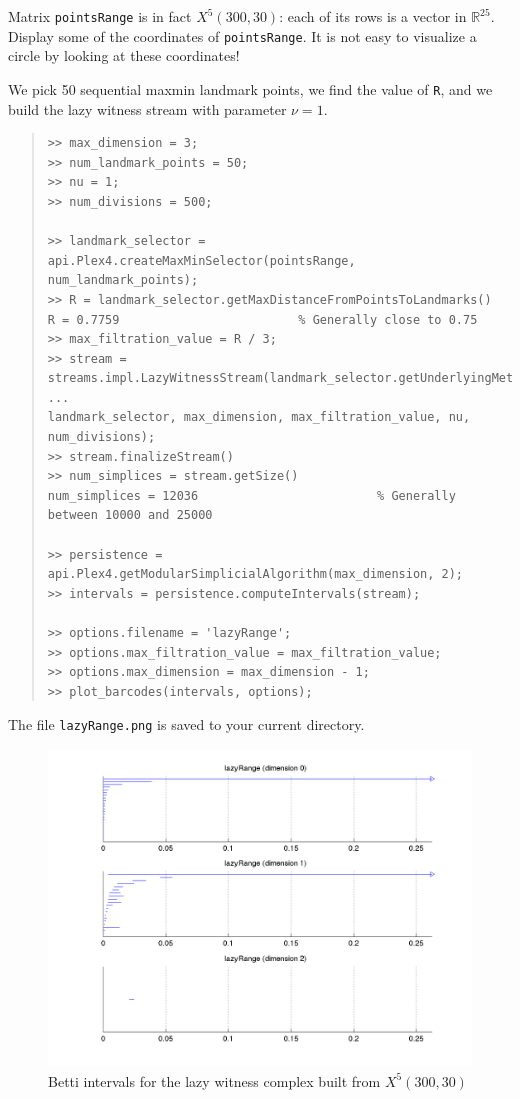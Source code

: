 \documentclass[amscd, amssymb, verbatim]{amsart}[12pt]
\theoremstyle{remark}
\theoremstyle{remark}
\theoremstyle{remark}
\begin{document}
Matrix \texttt{pointsRange} is in fact $X^5(300,30)$: each of its rows is a vector in $\mathbb{R}^{25}$. Display some of the coordinates of \texttt{pointsRange}. It is not easy to visualize a circle by looking at these coordinates! 

We pick 50 sequential maxmin landmark points, we find the value of \texttt{R}, and we build the lazy witness stream with parameter $\nu = 1$. 

\begin{quote} \begin{verbatim}
>> max_dimension = 3;
>> num_landmark_points = 50;
>> nu = 1;
>> num_divisions = 500;

>> landmark_selector = api.Plex4.createMaxMinSelector(pointsRange, num_landmark_points);
>> R = landmark_selector.getMaxDistanceFromPointsToLandmarks() 
R = 0.7759                         % Generally close to 0.75
>> max_filtration_value = R / 3;
>> stream = streams.impl.LazyWitnessStream(landmark_selector.getUnderlyingMetricSpace(), ...
landmark_selector, max_dimension, max_filtration_value, nu, num_divisions);
>> stream.finalizeStream()
>> num_simplices = stream.getSize()
num_simplices = 12036                         % Generally between 10000 and 25000

>> persistence = api.Plex4.getModularSimplicialAlgorithm(max_dimension, 2);
>> intervals = persistence.computeIntervals(stream);

>> options.filename = 'lazyRange';
>> options.max_filtration_value = max_filtration_value;
>> options.max_dimension = max_dimension - 1;
>> plot_barcodes(intervals, options);
\end{verbatim} \end{quote}

The file \texttt{lazyRange.png} is saved to your current directory.

\begin{figure}[htp]
	\begin{center}
    	\includegraphics[width=6in]{lazyRange.png}
   	\end{center}
	\caption{Betti intervals for the lazy witness complex built from $X^5(300,30)$}
  	\label{fig:rangeBetti}
\end{figure}
\FloatBarrier
\end{document}
